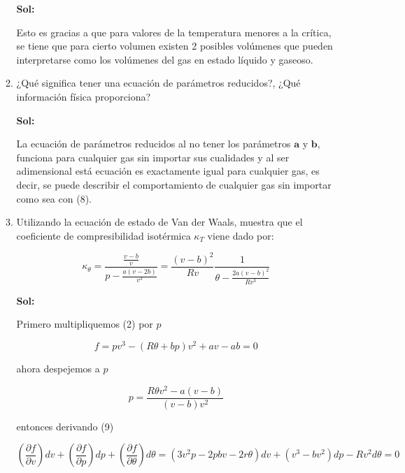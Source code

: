 \documentclass[12pt,a4paper]{article}
\begin{document}
\begin{enumerate}
\begin{enumerate}
        \textbf{Sol:}
        
        Esto es gracias a que para valores de la temperatura menores a la crítica, se tiene que para cierto volumen existen 2 posibles volúmenes que pueden interpretarse como los volúmenes del gas en estado líquido y gaseoso.
        
        
        
        
        \item ¿Qué significa tener una ecuación de parámetros reducidos?, ¿Qué información física proporciona?
        
        \textbf{Sol:}
        
        La ecuación de parámetros reducidos al no tener los parámetros $\mathbf{a}$ y $\mathbf{b}$, funciona para cualquier gas sin importar sus cualidades y al ser adimensional está ecuación es exactamente igual para cualquier gas, es decir, se puede describir el comportamiento de cualquier gas sin importar como sea con (8).
        
        
        
        
        \item Utilizando la ecuación de estado de Van der Waals, muestra que el coeficiente de compresibilidad isotérmica $\kappa_{T}$ viene dado por:
        
        
        \begin{equation*}
            \kappa_{\theta} = \frac{\frac{v-b}{v}}{p - \frac{a(v-2b)}{v^3}} = \frac{(v-b)^2}{R v} \frac{1}{\theta - \frac{2a(v-b)^2}{Rv^3}}
        \end{equation*}
        
        
        \textbf{Sol:}
        
        Primero multipliquemos (2) por $p$
        
        \begin{equation}
          f=   pv^3 - (R\theta + bp) v^2 + av - ab = 0
        \end{equation}
        
        ahora despejemos a $p$
        
        \begin{equation}
            p = \frac{R\theta v^2 - a(v-b)}{(v-b)v^2}
        \end{equation}
        
        entonces derivando (9)
        
        \begin{equation}
        \left(\frac{\partial f}{\partial v}\right) dv + \left(\frac{\partial f}{\partial p}\right) dp + \left(\frac{\partial f}{\partial \theta}\right) d\theta = (3v^2p - 2pbv-2r\theta) dv + (v^3 - bv^2)dp - Rv^2 d\theta =0
        \end{equation}
        

\end{enumerate}
\end{enumerate}
\end{document}
